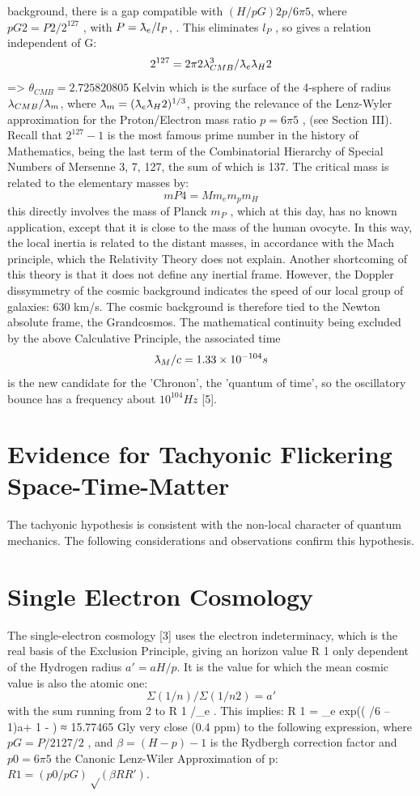 background, there is a gap compatible with $(H/p G ) 2 p/6\pi 5 $, where $p G 2 = P 2 /2^{127}$ , with $P = \lambdabar_{e} /l_{P}$, . 
This eliminates $l_{P}$ , so gives a relation independent of G:
$$2^{127} = 2\pi 2 \lambda_{CMB}^{3} /\lambdabar_{e} \lambdabar_{H} 2$$
=> $θ_{CMB} = 2.725820805$ Kelvin which is the surface of the 4-sphere of radius $\lambda_{CMB} / \lambdabar_{m}$, where $\lambdabar_{m} = (\lambdabar_{e} \lambdabar_{H} 2 )^{1/3} $, proving the relevance of
the Lenz-Wyler approximation for the Proton/Electron mass ratio $p = 6\pi 5$ , (see Section III). Recall
that $2^{127} - 1$ is the most famous prime number in the history of Mathematics, being the last term of
the Combinatorial Hierarchy of Special Numbers of Mersenne 3, 7, 127, the sum of which is 137.
The critical mass is related to the elementary masses by:
$$m P4 = M m_{e} m_{p} m_{H}$$
this directly involves the mass of Planck $m_{P}$ , which at this day, has no known application, except
that it is close to the mass of the human ovocyte. In this way, the local inertia is related to the distant
masses, in accordance with the Mach principle, which the Relativity Theory does not explain.
Another shortcoming of this theory is that it does not define any inertial frame. However, the
Doppler dissymmetry of the cosmic background indicates the speed of our local group of galaxies:
630 km/s. The cosmic background is therefore tied to the Newton absolute frame, the Grandcosmos.
The mathematical continuity being excluded by the above Calculative Principle, the associated
time $$\lambdabar_{M} /c = 1.33 \times 10^{-104} s$$ is the new candidate for the 'Chronon', the 'quantum of time', so the
oscillatory bounce has a frequency about $10^{104}Hz$ [5].

\section {Evidence for Tachyonic Flickering Space-Time-Matter}

The tachyonic hypothesis is consistent with the non-local character of quantum mechanics. The
following considerations and observations confirm this hypothesis.

\section {Single Electron Cosmology}

The single-electron cosmology [3] uses the electron indeterminacy, which is the real basis of the
Exclusion Principle, giving an horizon value R 1 only dependent of the Hydrogen radius $a' = aH/p$. It
is the value for which the mean cosmic value is also the atomic one:
$$Σ(1/n)/Σ(1/n 2 ) = a\prime$$
with the sum running from 2 to R 1 /\lambdabar_{e} . This implies:
R 1 = \lambdabar_{e} exp(( /6 – 1)a\prime + 1 - \gamma) ≈ 15.77465 Gly
very close (0.4 ppm) to the following expression, where $p G = P/2 127/2$ , and $β = (Η-p) -1$ is the
Rydbergh correction factor and $p 0 = 6\pi 5$ the Canonic Lenz-Wiler Approximation of p:
$R 1 = ( p 0 /p G ) √(βRR')$.

